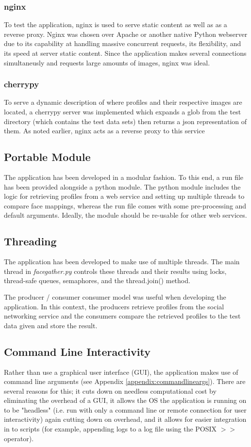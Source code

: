 \documentclass[12pt]{article}
\begin{document}
\subsubsection{nginx}
To test the application, nginx is used to serve static content as well as as a reverse proxy. Nginx was chosen over Apache or another native Python webserver due to its capability at handling massive concurrent requests, its flexibility, and its speed at server static content. Since the application makes several connections simultaneusly and requests large amounts of images, nginx was ideal.

\subsubsection{cherrypy}
To serve a dynamic description of where profiles and their respective images are located, a cherrypy server was implemented which expands a glob from the test directory (which contains the test data sets) then returns a json representation of them. As noted earlier, nginx acts as a reverse proxy to this service

\subsection{Portable Module}
The application has been developed in a modular fashion. To this end, a run file has been provided alongside a python module. The python module includes the logic for retrieving profiles from a web service and setting up multiple threads to compare face mappings, whereas the run file comes with some pre-processing and default arguments. Ideally, the module should be re-usable for other web services.

\subsection{Threading}
The application has been developed to make use of multiple threads. The main thread in \textit{facegather.py} controls these threads and their results using locks, thread-safe queues, semaphores, and the thread.join() method.

The producer / consumer consumer model was useful when developing the application. In this context, the producers retrieve profiles from the social networking service and the consumers compare the retrieved profiles to the test data given and store the result.

\subsection{Command Line Interactivity}
Rather than use a graphical user interface (GUI), the application makes use of command line arguments (see Appendix \ref{appendix:commandlineargs}). There are several reasons for this; it cuts down on needless computational cost by eliminating the overhead of a GUI, it allows the OS the application is running on to be "headless" (i.e. run with only a command line or remote connection for user interactivity) again cutting down on overhead, and it allows for easier integration in to scripts (for example, appending logs to a log file using the POSIX $>>$ operator).
\end{document}
